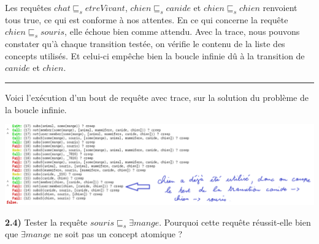 \documentclass[a4paper,12pt]{report}
\begin{document}
\begin{tcolorbox}[colback=gray!10, colframe=blue!30, coltitle=black, title=Réponse à la question 2.3 - 1/1]

    Les requêtes \(chat \sqsubseteq_s etreVivant\), \(chien \sqsubseteq_s canide\) et \(chien \sqsubseteq_s chien\) renvoient tous true, ce qui est conforme
        à nos attentes. En ce qui concerne la requête \(chien \sqsubseteq_s souris\), elle échoue bien comme attendu. Avec la trace, nous pouvons constater
        qu'à chaque transition testée, on vérifie le contenu de la liste des concepts utilisés. Et celui-ci empêche bien la boucle infinie dû à la transition de
        \(canide\) et \(chien\).

    \vspace{0.5cm}
    \hrule
    \vspace{0.5cm}

    Voici l'exécution d'un bout de requête avec trace, sur la solution du problème de la boucle infinie.
    \begin{center}
        \includegraphics[width=1\textwidth]{./images/chien_souris_not_infini.png}\\[1.5cm]
    \end{center}

\end{tcolorbox}




\newpage

{}

\textbf{2.4)} Tester la requête \(souris \sqsubseteq_s  \exists mange\). Pourquoi cette requête réussit-elle bien que \(\exists mange\) ne soit pas un concept atomique ?
\end{document}
